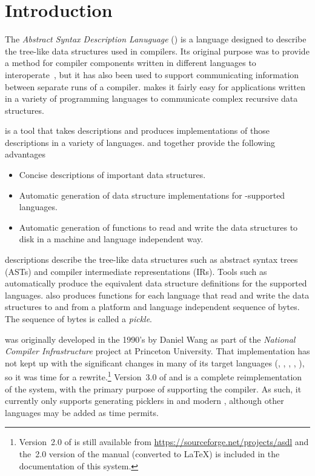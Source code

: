 %
\chapter{Introduction}
\label{chap:introduction}

\thispagestyle{empty}

The \emph{Abstract Syntax Description Lanuguage} (\asdl{}) is a language
designed to describe the tree-like data structures used in compilers.
Its original purpose was to provide a method for
compiler components written in different languages to
interoperate~\cite{usenix:zephyr-asdl}, but it has also been
used to support communicating information between separate runs
of a compiler.
\asdl{} makes it fairly easy for applications written in a
variety of programming languages to communicate complex recursive data
structures. 

\asdlgen{} is a tool that takes \asdl{} descriptions and produces
implementations of those descriptions in a variety of languages.
\asdl{} and \asdlgen{} together provide the following advantages
\begin{itemize}
  \item Concise descriptions of important data structures.
  \item Automatic generation of data structure implementations for
    \asdlgen{}-supported languages.
  \item Automatic generation of functions to read and write the data
    structures to disk in a machine and language independent way.
\end{itemize}%

\asdl{} descriptions describe the tree-like data structures such as
abstract syntax trees (ASTs) and compiler intermediate representations
(IRs).
Tools such as \asdlgen{} automatically produce the equivalent
data structure definitions for the supported languages.
\asdlgen{} also produces functions for each language that read and
write the data structures to and from a platform and language
independent sequence of bytes.
The sequence of bytes is called a \emph{pickle}.

\asdl{} was originally developed in the 1990's by Daniel Wang as part of the
\emph{National Compiler Infrastructure} project at Princeton University.
That \asdl{} implementation has not kept up with the significant changes
in many of its target languages (\eg{}, \Cplusplus{}, \haskell{}, \java{},
\etc{}), so it was time for a rewrite.\footnote{
  Version~2.0 of \asdl{} is still available from
  \url{https://sourceforge.net/projects/asdl}
  and the~2.0 version of the manual (converted to \LaTeX{}) is included
  in the documentation of this system.
}
Version~3.0 of \asdl{} and \asdlgen{} is a complete reimplementation of the
system, with the primary purpose of supporting the \smlnj{} compiler.
As such, it currently only supports generating picklers in \sml{} and
modern \Cplusplus{}, although other languages may be added as time
permits.

